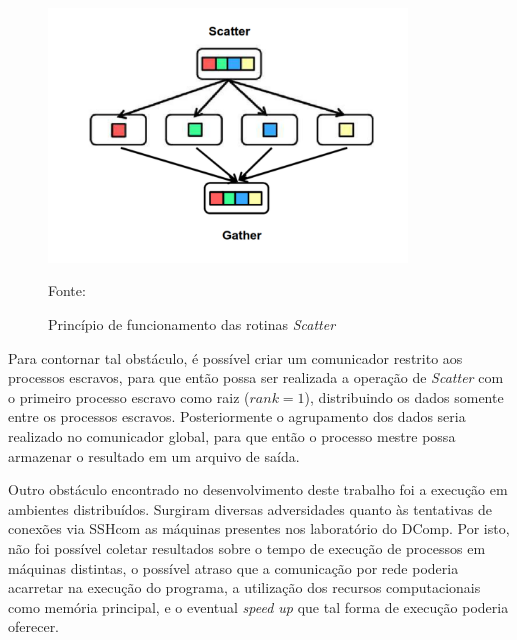 \documentclass[a4paper, 12pt]{article}
\begin{document}
\begin{figure}[H]
    \centering
    \includegraphics[width=0.85\textwidth]{Images/scatterv.pdf}
    \caption{Princípio de funcionamento das rotinas \emph{Scatter}}
    \vspace{0.2cm}
    \hspace*{15pt}\hbox{\small Fonte:}\\
    \label{fig:map6}
\end{figure}


Para contornar tal obstáculo, é possível criar um comunicador restrito aos processos escravos, para que então possa ser realizada a operação de \emph{Scatter} com o primeiro processo escravo como raiz (\(rank = 1\)), distribuindo os dados somente entre os processos escravos. Posteriormente o agrupamento dos dados seria realizado no comunicador global, para que então o processo mestre possa armazenar o resultado em um arquivo de saída.

Outro obstáculo encontrado no desenvolvimento deste trabalho foi a execução em ambientes distribuídos. Surgiram diversas adversidades quanto às tentativas de conexões via SSH\footnotemark \hspace{0.1cm}com as máquinas presentes nos laboratório do DComp. Por isto, não foi possível coletar resultados sobre o tempo de execução de processos em máquinas distintas, o possível atraso que a comunicação por rede poderia acarretar na execução do programa, a utilização dos recursos computacionais como memória principal, e o eventual \emph{speed up} que tal forma de execução poderia oferecer. 
\end{document}
